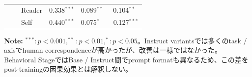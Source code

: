 \begin{table}[htbp]
\begin{tabular}{lll ccc}
                                 &                          & Reader     & 0.338$^{***}$            & 0.089$^{**}\phantom{^{*}}$ & 0.104$^{**}\phantom{^{*}}$ \\
                                 &                          & Self       & 0.440$^{***}$            & 0.075$^{*}\phantom{^{**}}$ & 0.127$^{***}$            \\
\bottomrule
\end{tabular}
\vspace{1ex}
\begin{minipage}{\linewidth}
\footnotesize
\textbf{Note:} $^{***}: p < 0.001, ^{**}: p < 0.01, ^{*}: p < 0.05$。Instruct variantsでは多くのtask / axisでhuman correspondenceが高かったが、改善は一様ではなかった。Behavioral StageではBase / Instruct間でprompt formatも異なるため、この差をpost-trainingの因果効果とは解釈しない。
\end{minipage}
\end{table}
